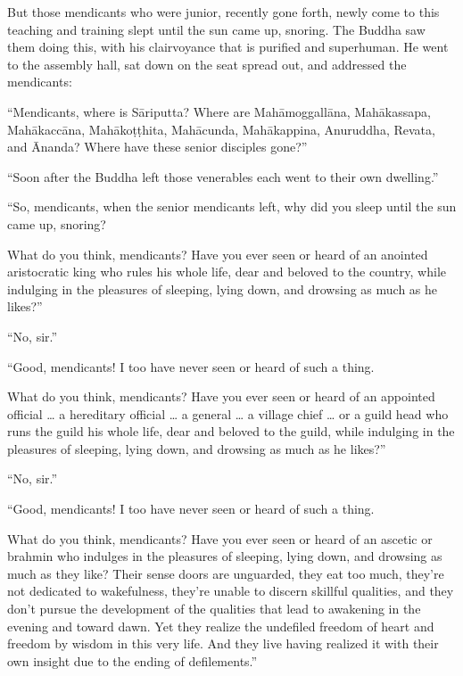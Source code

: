 \documentclass[12pt,openany]{book}%
\begin{document}
But those mendicants who were junior, recently gone forth, newly come to this teaching and training slept until the sun came up, snoring. The Buddha saw them doing this, with his clairvoyance that is purified and superhuman. He went to the assembly hall, sat down on the seat spread out, and addressed the mendicants: 

“Mendicants, where is \textsanskrit{Sāriputta}? Where are \textsanskrit{Mahāmoggallāna}, \textsanskrit{Mahākassapa}, \textsanskrit{Mahākaccāna}, \textsanskrit{Mahākoṭṭhita}, \textsanskrit{Mahācunda}, \textsanskrit{Mahākappina}, Anuruddha, Revata, and Ānanda? Where have these senior disciples gone?” 

“Soon after the Buddha left those venerables each went to their own dwelling.” 

“So, mendicants, when the senior mendicants left, why did you sleep until the sun came up, snoring? 

What do you think, mendicants? Have you ever seen or heard of an anointed aristocratic king who rules his whole life, dear and beloved to the country, while indulging in the pleasures of sleeping, lying down, and drowsing as much as he likes?” 

“No, sir.” 

“Good, mendicants! I too have never seen or heard of such a thing. 

What do you think, mendicants? Have you ever seen or heard of an appointed official … a hereditary official … a general … a village chief … or a guild head who runs the guild his whole life, dear and beloved to the guild, while indulging in the pleasures of sleeping, lying down, and drowsing as much as he likes?” 

“No, sir.” 

“Good, mendicants! I too have never seen or heard of such a thing. 

What do you think, mendicants? Have you ever seen or heard of an ascetic or brahmin who indulges in the pleasures of sleeping, lying down, and drowsing as much as they like? Their sense doors are unguarded, they eat too much, they’re not dedicated to wakefulness, they’re unable to discern skillful qualities, and they don’t pursue the development of the qualities that lead to awakening in the evening and toward dawn. Yet they realize the undefiled freedom of heart and freedom by wisdom in this very life. And they live having realized it with their own insight due to the ending of defilements.” 
\end{document}
